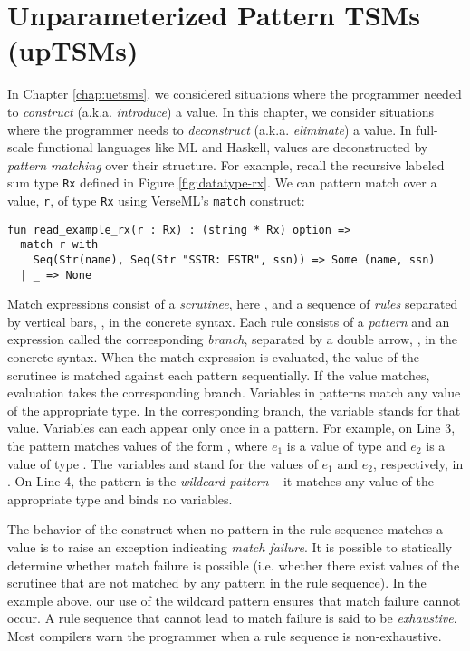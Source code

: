\chapter{Unparameterized Pattern TSMs (upTSMs)}\label{chap:uptsms}
In Chapter \ref{chap:uetsms}, we considered situations where the programmer needed to \emph{construct} (a.k.a. \emph{introduce}) a value. In this chapter, we consider situations where the programmer needs to \emph{deconstruct} (a.k.a. \emph{eliminate}) a value. In full-scale functional languages like ML and Haskell, values are deconstructed by \emph{pattern matching} over their structure. For example, recall the recursive labeled sum type \lstinline{Rx} defined in Figure \ref{fig:datatype-rx}. We can pattern match over a value, \lstinline{r}, of type \lstinline{Rx} using VerseML's \lstinline{match} construct:
\begin{lstlisting}
fun read_example_rx(r : Rx) : (string * Rx) option => 
  match r with 
    Seq(Str(name), Seq(Str "SSTR: ESTR", ssn)) => Some (name, ssn)
  | _ => None
\end{lstlisting}

Match expressions consist of a \emph{scrutinee}, here , and a sequence of \emph{rules} separated by vertical bars, \li{|}, in the concrete syntax. Each rule consists of a \emph{pattern} and an {expression} called the corresponding \emph{branch}, separated by a double arrow, \li{=>}, in the concrete syntax. When the {match} expression is evaluated, the value of the scrutinee is matched against each pattern sequentially. If the value matches, evaluation takes the corresponding branch. Variables in patterns match any value of the appropriate type. In the corresponding branch, the variable stands for that value. Variables can each appear only once in a pattern.  
For example, on Line 3, the pattern  matches values of the form , where $e_1$ is a value of type  and $e_2$ is a value of type . The variables  and  stand for the values of $e_1$ and $e_2$, respectively, in . On Line 4, the pattern \li{_} is the \emph{wildcard pattern} -- it matches any value of the appropriate type and binds no variables.

The behavior of the  construct when no pattern in the rule sequence matches a value is to raise an exception indicating \emph{match failure}. It is possible to statically determine whether match failure is possible (i.e. whether there exist values of the scrutinee that are not matched by any pattern in the rule sequence). In the example above, our use of the wildcard pattern ensures that match failure cannot occur. A rule sequence that cannot lead to match failure is said to be \emph{exhaustive}. Most compilers warn the programmer when a rule sequence is non-exhaustive.

